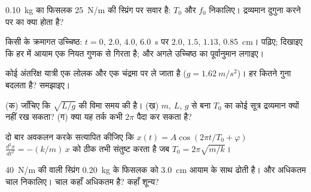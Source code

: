 \begin{exercise}[$\star$]\label{exo:g12:oscillators-and-time:3}
\qty{0.10}{kg} का फिसलक \qty{25}{N/m} की स्प्रिंग पर सवार है: $T_0$ और $f_0$ निकालिए।
द्रव्यमान दुगुना करने पर  का क्या होता है?
\end{exercise}

\begin{exercise}[$\star$]\label{exo:g12:oscillators-and-time:4}
किसी   के क्रमागत उच्चिष्ठ: $t = 0$, $2.0$,
$4.0$, \qty{6.0}{s} पर $2.0$, $1.5$, $1.13$, \qty{0.85}{cm}।
 पढ़िए; दिखाइए कि हर  में आयाम
एक नियत गुणक से गिरता है; और अगले उच्चिष्ठ का पूर्वानुमान लगाइए।
\end{exercise}

\begin{exercise}[$\star$]\label{exo:g12:oscillators-and-time:5}
कोई अंतरिक्ष यात्री एक लोलक और एक  चंद्रमा
पर ले जाता है ($g = \qty{1.62}{m/s^2}$)। हर  कितने गुना बदलता है? समझाइए।
\end{exercise}

\begin{exercise}[$\star\star$]\label{exo:g12:oscillators-and-time:6}
(क) जाँचिए कि $\sqrt{L/g}$ की विमा समय की है। (ख) $m$, $L$, $g$ से बना
$T_0$ का कोई सूत्र द्रव्यमान क्यों नहीं रख सकता? (ग) क्या यह तर्क कभी
$2\pi$ पैदा कर सकता है?
\end{exercise}

\begin{exercise}[$\star\star$]\label{exo:g12:oscillators-and-time:7}
दो बार अवकलन करके सत्यापित कीजिए कि $x(t) = A\cos(2\pi t/T_0 +
\varphi)$ $\frac{d^2x}{dt^2} = -(k/m)\,x$ को ठीक तभी संतुष्ट करता है
जब $T_0 = 2\pi\sqrt{m/k}$।
\end{exercise}

\begin{exercise}[$\star\star$]\label{exo:g12:oscillators-and-time:8}
\qty{40}{N/m} की  वाली स्प्रिंग \qty{0.20}{kg} के फिसलक को \qty{3.0}{cm}
आयाम के साथ ढोती है।  और अधिकतम चाल निकालिए।
चाल कहाँ अधिकतम है? कहाँ शून्य?
\end{exercise}

